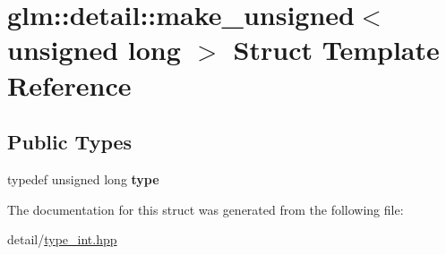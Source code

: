 \hypertarget{structglm_1_1detail_1_1make__unsigned_3_01unsigned_01long_01_4}{\section{glm\-:\-:detail\-:\-:make\-\_\-unsigned$<$ unsigned long $>$ Struct Template Reference}
\label{structglm_1_1detail_1_1make__unsigned_3_01unsigned_01long_01_4}
}
\subsection*{Public Types}
\begin{DoxyCompactItemize}
\item 
\hypertarget{structglm_1_1detail_1_1make__unsigned_3_01unsigned_01long_01_4_a8894ccd179135bda131b42cf10e58362}{typedef unsigned long {\bfseries type}}\label{structglm_1_1detail_1_1make__unsigned_3_01unsigned_01long_01_4_a8894ccd179135bda131b42cf10e58362}

\end{DoxyCompactItemize}


The documentation for this struct was generated from the following file\-:\begin{DoxyCompactItemize}
\item 
detail/\hyperlink{type__int_8hpp}{type\-\_\-int.\-hpp}\end{DoxyCompactItemize}
